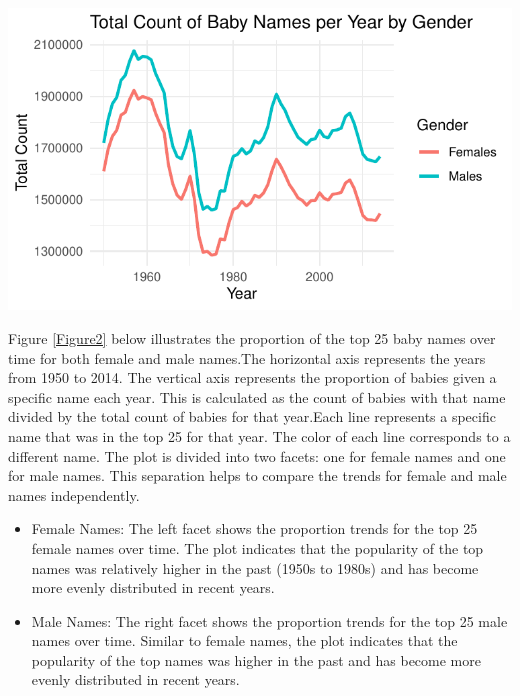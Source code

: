 \documentclass[11pt,preprint, authoryear]{elsarticle}
\let\origfigure\figure
\let\endorigfigure\endfigure
\renewenvironment{figure}[1][2] {
    \expandafter\origfigure\expandafter[H]
} {
    \endorigfigure
}
\numberwithin{equation}{section}
\numberwithin{figure}{section}
\numberwithin{table}{section}
\begin{document}
\begin{figure}

{\centering \includegraphics{README_files/figure-latex/unnamed-chunk-1-1} 

}

\caption{Total Count of Baby Names by Gender.\label{Figure1}}\label{fig:unnamed-chunk-1}
\end{figure}

Figure \ref{Figure2} below illustrates the proportion of the top 25 baby
names over time for both female and male names.The horizontal axis
represents the years from 1950 to 2014. The vertical axis represents the
proportion of babies given a specific name each year. This is calculated
as the count of babies with that name divided by the total count of
babies for that year.Each line represents a specific name that was in
the top 25 for that year. The color of each line corresponds to a
different name. The plot is divided into two facets: one for female
names and one for male names. This separation helps to compare the
trends for female and male names independently.

\begin{itemize}
\item
  Female Names: The left facet shows the proportion trends for the top
  25 female names over time. The plot indicates that the popularity of
  the top names was relatively higher in the past (1950s to 1980s) and
  has become more evenly distributed in recent years.
\item
  Male Names: The right facet shows the proportion trends for the top 25
  male names over time. Similar to female names, the plot indicates that
  the popularity of the top names was higher in the past and has become
  more evenly distributed in recent years.
\end{itemize}
\end{document}
